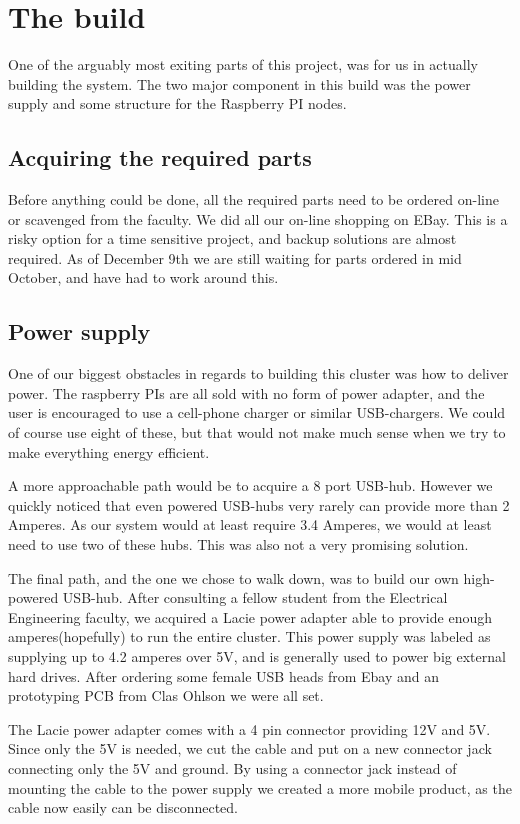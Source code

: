 \clearpage
\section{The build}
\label{sec:build}
One of the arguably most exiting parts of this project, was for us in actually building the system. The two major component in this build was the power supply and some structure for the Raspberry PI nodes. 

\subsection{Acquiring the required parts}
Before anything could be done, all the required parts need to be ordered on-line or scavenged from the faculty. We did all our on-line shopping on EBay. This is a risky option for a time sensitive project, and backup solutions are almost required. As of December 9th we are still waiting for parts ordered in mid October, and have had to work around this.  

\subsection{Power supply}
One of our biggest obstacles in regards to building this cluster was how to deliver power. The raspberry PIs are all sold with no form of power adapter, and the user is encouraged to use a cell-phone charger or similar USB-chargers. We could of course use eight of these, but that would not make much sense when we try to make everything energy efficient. 

A more approachable path would be to acquire a 8 port USB-hub. However we quickly noticed that even powered USB-hubs very rarely can provide more than 2 Amperes. As our system would at least require 3.4 Amperes, we would at least need to use two of these hubs. This was also not a very promising solution.

The final path, and the one we chose to walk down, was to build our own high-powered USB-hub. After consulting a fellow student from the Electrical Engineering faculty, we acquired a Lacie power adapter able to provide enough amperes(hopefully) to run the entire cluster. This power supply was labeled as supplying up to 4.2 amperes over 5V, and is generally used to power big external hard drives. After ordering some female USB heads from Ebay and an prototyping PCB from Clas Ohlson we were all set. 

The Lacie power adapter comes with a 4 pin connector providing 12V and 5V. Since only the 5V is needed, we cut the cable and put on a new connector jack connecting only the 5V and ground. By using a connector jack instead of mounting the cable to the power supply we created a more mobile product, as the cable now easily can be disconnected.

